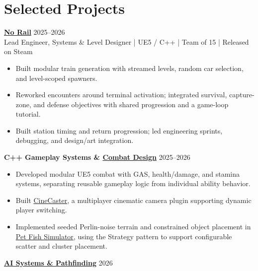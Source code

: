 \documentclass[10pt,letterpaper]{extarticle}
\begin{document}
\section*{Selected Projects}
\textbf{\href{https://nrhart.github.io/NoahsPortfolio/projects/unreal.html\#no-rail}{No Rail}} \hfill 2025--2026\\[-2pt]
Lead Engineer, Systems \& Level Designer | UE5 / C++ | Team of 15 | Released on Steam
\begin{itemize}
\item Built modular train generation with streamed levels, random car selection, and level-scoped spawners.
\item Reworked encounters around terminal activation; integrated survival, capture-zone, and defense objectives with shared progression and a game-loop tutorial.
\item Built station timing and return progression; led engineering sprints, debugging, and design/art integration.
\end{itemize}
\vspace{2.15pt}
\textbf{C++ Gameplay Systems \& \href{https://nrhart.github.io/NoahsPortfolio/projects/combat.html}{Combat Design}} \hfill 2025--2026
\begin{itemize}
\item Developed modular UE5 combat with GAS, health/damage, and stamina systems, separating reusable gameplay logic from individual ability behavior.
\item Built \href{https://nrhart.github.io/NoahsPortfolio/projects/unreal.html\#cinecaster}{CineCaster}, a multiplayer cinematic camera plugin supporting dynamic player switching.
\item Implemented seeded Perlin-noise terrain and constrained object placement in \href{https://nrhart.github.io/NoahsPortfolio/projects/unreal.html\#pet-fish-simulator}{Pet Fish Simulator}, using the Strategy pattern to support configurable scatter and cluster placement.
\end{itemize}
\vspace{2.15pt}
\textbf{\href{https://nrhart.github.io/NoahsPortfolio/projects/ai.html}{AI Systems \& Pathfinding}} \hfill 2026
\end{document}
